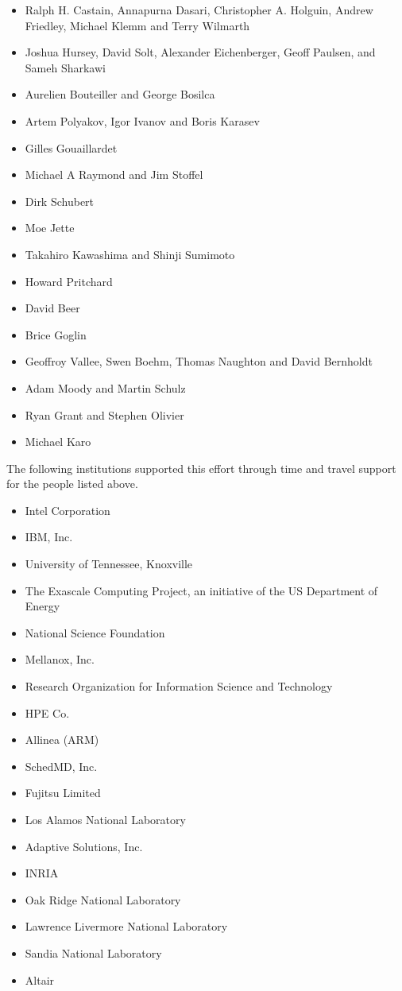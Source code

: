 \begin{itemize}
\item Ralph H. Castain, Annapurna Dasari, Christopher A. Holguin, Andrew Friedley, Michael Klemm and Terry Wilmarth
\item Joshua Hursey, David Solt, Alexander Eichenberger, Geoff Paulsen, and Sameh Sharkawi
\item Aurelien Bouteiller and George Bosilca
\item Artem Polyakov, Igor Ivanov and Boris Karasev
\item Gilles Gouaillardet
\item Michael A Raymond and Jim Stoffel
\item Dirk Schubert
\item Moe Jette
\item Takahiro Kawashima and Shinji Sumimoto
\item Howard Pritchard
\item David Beer
\item Brice Goglin
\item Geoffroy Vallee, Swen Boehm, Thomas Naughton and David Bernholdt
\item Adam Moody and Martin Schulz
\item Ryan Grant and Stephen Olivier
\item Michael Karo
\end{itemize}

The following institutions supported this effort through time and travel support for the people listed above.

\begin{itemize}
\item Intel Corporation
\item IBM, Inc.
\item University of Tennessee, Knoxville
\item The Exascale Computing Project, an initiative of the US Department of Energy
\item National Science Foundation
\item Mellanox, Inc.
\item Research Organization for Information Science and Technology
\item HPE Co.
\item Allinea (ARM)
\item SchedMD, Inc.
\item Fujitsu Limited
\item Los Alamos National Laboratory
\item Adaptive Solutions, Inc.
\item INRIA
\item Oak Ridge National Laboratory
\item Lawrence Livermore National Laboratory
\item Sandia National Laboratory
\item Altair
\end{itemize}



